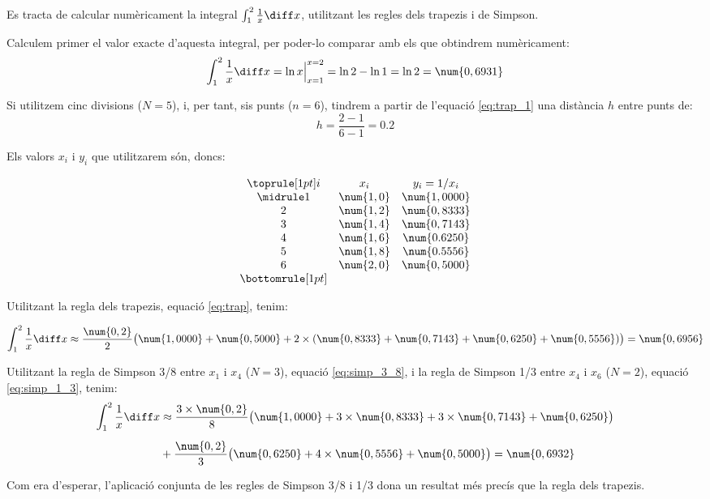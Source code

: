 \begin{exemple}\label{ex:IntegracioNum}
	\addcontentsxms{\IntegracioNum}
    Es tracta de calcular numèricament la integral $\int_1^2 \frac{1}{x} \diff x$, utilitzant les regles dels trapezis i de Simpson.

    Calculem primer el valor exacte d'aquesta integral, per  poder-lo comparar amb els que obtindrem  numèricament:
    \[
      \int_1^2 \frac{1}{x} \diff x = \ln x \Bigr|_{x=1}^{x=2} = \ln 2 - \ln 1 = \ln 2 = \num{0,6931}
    \]

    Si utilitzem cinc divisions ($N=5$), i, per tant, sis punts ($n=6$), tindrem a partir de l'equació \eqref{eq:trap_1} una distància $h$ entre punts de:
    \[
        h = \frac{2-1}{6-1} = \num{0,2}
    \]

    Els valors $x_i$ i $y_i$ que utilitzarem són, doncs:
    \vspace{-8mm}
    \begin{center}
        \[\begin{array}{ccc}
           \toprule[1pt]
              i & x_i  & y_i = 1/x_i \\
           \midrule
              1 & \num{1,0} & \num{1,0000} \\
              2 & \num{1,2} & \num{0,8333} \\
              3 & \num{1,4} & \num{0,7143} \\
              4 & \num{1,6} & \num{0.6250} \\
              5 & \num{1,8} & \num{0.5556} \\
              6 & \num{2,0} & \num{0,5000} \\
           \bottomrule[1pt]
        \end{array} \]
    \end{center}

    \pagebreak
    Utilitzant la regla dels trapezis, equació \eqref{eq:trap}, tenim:

    \[
        \int_1^2 \frac{1}{x} \diff x \approx \frac{\num{0,2}}{2} \big(\num{1,0000}+\num{0,5000} +2 \times(\num{0,8333}+ \num{0,7143} +
        \num{0,6250} + \num{0,5556}) \big) = \num{0,6956}
    \]

    Utilitzant la regla de Simpson 3/8 entre $x_1$ i $x_4$ ($N=3$), equació \eqref{eq:simp_3_8}, i la  regla de Simpson 1/3 entre $x_4$ i $x_6$ ($N=2$), equació \eqref{eq:simp_1_3}, tenim:
    \[\begin{split}
        \int_1^2 \frac{1}{x} \diff x &\approx \frac{3\times\num{0,2}}{8} \big(\num{1,0000}+3\times\num{0,8333} +3\times \num{0,7143} +
        \num{0,6250} \big) \\[0.5em]
        {}&+ \frac{\num{0,2}}{3} \big(\num{0,6250} +4\times \num{0,5556} + \num{0,5000} \big)
        = \num{0,6932}
    \end{split}\]

    Com era d'esperar, l'aplicació conjunta de les regles de Simpson 3/8 i 1/3 dona un resultat més precís que la regla dels trapezis.
\end{exemple}





